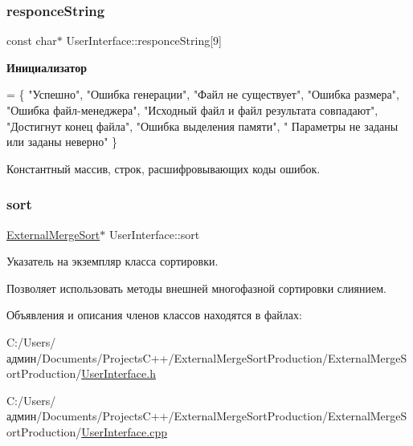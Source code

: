 \hypertarget{class_user_interface_a3ec4a2871150fd6b83ddf9d459aa0afc}{}\label{class_user_interface_a3ec4a2871150fd6b83ddf9d459aa0afc} 
\subsubsection{\texorpdfstring{responce\+String}{responceString}}
{\footnotesize\ttfamily const char$\ast$ User\+Interface\+::responce\+String\mbox{[}9\mbox{]}\hspace{0.3cm}{\ttfamily [private]}}

{\bfseries Инициализатор}
\begin{DoxyCode}
= \{ \textcolor{stringliteral}{"Успешно"}, \textcolor{stringliteral}{"Ошибка генерации"}, \textcolor{stringliteral}{"Файл не существует"}, \textcolor{stringliteral}{"Ошибка размера"}, \textcolor{stringliteral}{"Ошибка файл-менеджера"},
        \textcolor{stringliteral}{"Исходный файл и файл результата совпадают"}, \textcolor{stringliteral}{"Достигнут конец файла"}, \textcolor{stringliteral}{"Ошибка выделения памяти"}, \textcolor{stringliteral}{"
      Параметры не заданы или заданы неверно"} \}
\end{DoxyCode}


Константный массив, строк, расшифровывающих коды ошибок. 

\hypertarget{class_user_interface_af3405ffdb7e2834c2cf63662b5415a91}{}\label{class_user_interface_af3405ffdb7e2834c2cf63662b5415a91} 
\subsubsection{\texorpdfstring{sort}{sort}}
{\footnotesize\ttfamily \hyperlink{class_external_merge_sort}{External\+Merge\+Sort}$\ast$ User\+Interface\+::sort\hspace{0.3cm}{\ttfamily [private]}}



Указатель на экземпляр класса сортировки. 

Позволяет использовать методы внешней многофазной сортировки слиянием. 

Объявления и описания членов классов находятся в файлах\+:\begin{DoxyCompactItemize}
\item 
C\+:/\+Users/админ/\+Documents/\+Projects\+C++/\+External\+Merge\+Sort\+Production/\+External\+Merge\+Sort\+Production/\hyperlink{_user_interface_8h}{User\+Interface.\+h}\item 
C\+:/\+Users/админ/\+Documents/\+Projects\+C++/\+External\+Merge\+Sort\+Production/\+External\+Merge\+Sort\+Production/\hyperlink{_user_interface_8cpp}{User\+Interface.\+cpp}\end{DoxyCompactItemize}
